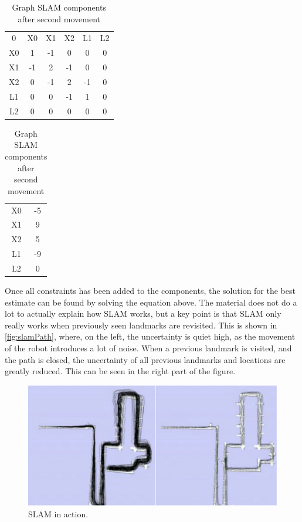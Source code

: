 \documentclass[Main]{subfiles}
\begin{document}
\begin{table}[H]
	\begin{subtable}{0.5\linewidth}
		\centering
	\begin{tabular}{cccccc}
		0 & X0 & X1 & X2 & L1 & L2 \\ 
		X0 & 1 & -1 & 0 & 0 & 0  \\ 
		X1 & -1 & 2 & -1 & 0 & 0  \\ 
		X2 & 0 & -1 & 2 & -1 & 0  \\  
		L1 & 0 & 0 & -1 & 1 & 0  \\ 
		L2 & 0 & 0 & 0 & 0 & 0  \\ 
	\end{tabular}
	\caption{$\Omega$ }
	\end{subtable}
	\begin{subtable}{0.5\linewidth}
		\centering
		\begin{tabular}{cc}
			X0 & -5 \\ 
			X1 & 9 \\ 
			X2 & 5 \\ 
			L1 & -9 \\  
			L2 & 0 \\ 
		\end{tabular}
	\caption{$\xi$}
	\end{subtable}
\caption{Graph SLAM components after second movement}
\label{table:landmark_graphslamtable} 
\end{table} \noindent

Once all constraints has been added to the components, the solution for the best estimate can be found by solving the equation above.
The material does not do a lot to actually explain how SLAM works, but a key point is that SLAM only really works when previously seen landmarks are revisited. 
This is shown in \autoref{fig:slamPath}, where, on the left, the uncertainty is quiet high, as the movement of the robot introduces a lot of noise.
When a previous landmark is visited, and the path is closed, the uncertainty of all previous landmarks and locations are greatly reduced. This can be seen in the right part of the figure.

\begin{figure}[H]
	\centering
	\includegraphics[width=0.9\linewidth]{./Figures/SLAMpath}
	\caption{SLAM in action.}
	\label{fig:slamPath}
\end{figure}\noindent
\end{document}
